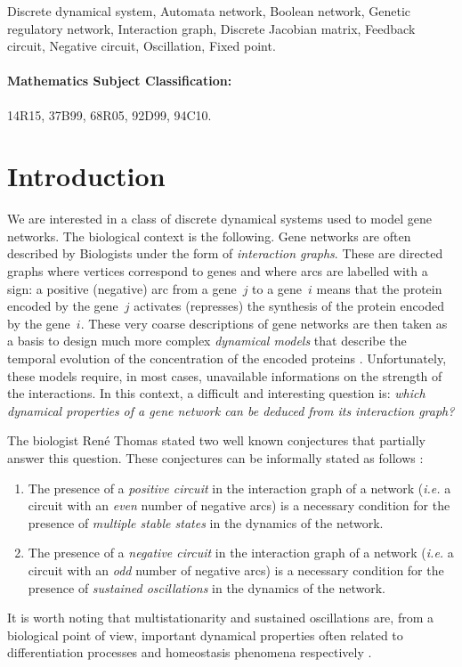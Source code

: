 \documentclass[11pt]{article}
\begin{document}
Discrete dynamical system, 
Automata network,
Boolean network,
Genetic regulatory network,
Interaction graph,
Discrete Jacobian matrix,
Feedback circuit,
Negative circuit,
Oscillation,
Fixed point.

\paragraph{Mathematics Subject Classification:}

14R15, 37B99, 68R05, 92D99, 94C10. 

\newpage

\section{Introduction}


We are interested in a class of discrete dynamical systems used to
model gene networks. The biological context is the following. Gene
networks are often described by Biologists under the form of
{\emph{interaction graphs}}. These are directed graphs where vertices
correspond to genes and where arcs are labelled with a sign: a
positive (negative) arc from a gene~$j$ to a gene~$i$ means that the
protein encoded by the gene~$j$ activates (represses) the synthesis of
the protein encoded by the gene~$i$. These very coarse descriptions of
gene networks are then taken as a basis to design much more complex
{\emph{dynamical models}} that describe the temporal evolution of the
concentration of the encoded proteins {\cite{dJ02}}. Unfortunately,
these models require, in most cases, unavailable informations on the
strength of the interactions. In this context, a difficult and
interesting question is: {\emph{which dynamical properties of a gene
network can be deduced from its interaction graph?}}

The biologist Ren\'e Thomas stated two well known conjectures that
partially answer this question. These conjectures can be informally
stated as follows {\cite{T81,KST07}}:
\begin{enumerate}
\item
The presence of a {\emph{positive circuit}} in the interaction graph
of a network ({\emph{i.e.}} a circuit with an {\emph{even}} number of
negative arcs) is a necessary condition for the presence of
{\emph{multiple stable states}} in the dynamics of the network.
\item
The presence of a {\emph{negative circuit}} in the interaction graph
of a network ({\emph{i.e.}} a circuit with an {\emph{odd}} number of negative
arcs) is a necessary condition for the presence of {\emph{sustained
oscillations}} in the dynamics of the network.
\end{enumerate}
It is worth noting that multistationarity and sustained oscillations
are, from a biological point of view, important dynamical properties often
related to differentiation processes and homeostasis phenomena
respectively {\cite{T81,TA90,TK01}}.
\end{document}
